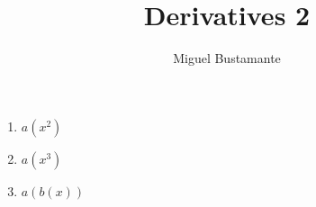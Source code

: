 \documentclass{article}
\title{Derivatives 2}
\author{Miguel Bustamante}
\begin{document}
\maketitle
\begin{multicols}{3}
\begin{enumerate}
    \item $a(x^2)$
    \item $a(x^3)$
    \item $a(b(x))$
\end{enumerate} 
\end{multicols}
\end{document}
